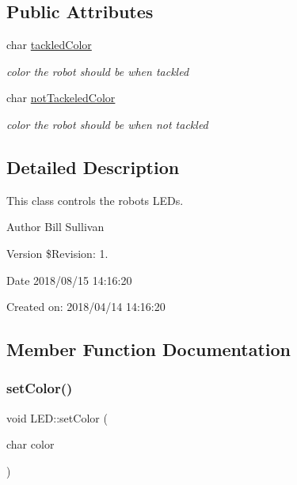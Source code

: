 \subsection*{Public Attributes}
\begin{DoxyCompactItemize}
\item 
\mbox{\label{class_l_e_d_abdf064808bc54c7ca18456de4f0df0a0}} 
char \mbox{\hyperlink{class_l_e_d_abdf064808bc54c7ca18456de4f0df0a0}{tackled\+Color}}
\begin{DoxyCompactList}\small\item\em color the robot should be when tackled \end{DoxyCompactList}\item 
\mbox{\label{class_l_e_d_acea9ddf3407c6535463a509d04ddfeda}} 
char \mbox{\hyperlink{class_l_e_d_acea9ddf3407c6535463a509d04ddfeda}{not\+Tackeled\+Color}}
\begin{DoxyCompactList}\small\item\em color the robot should be when not tackled \end{DoxyCompactList}\end{DoxyCompactItemize}


\subsection{Detailed Description}
This class controls the robots L\+E\+Ds. 

\begin{DoxyAuthor}{Author}
Bill Sullivan
\end{DoxyAuthor}
\begin{DoxyVersion}{Version}
\$\+Revision\+: 1.
\end{DoxyVersion}
\begin{DoxyDate}{Date}
2018/08/15 14\+:16\+:20
\end{DoxyDate}
Created on\+: 2018/04/14 14\+:16\+:20 

\subsection{Member Function Documentation}
\mbox{\label{class_l_e_d_ad122ee4ef58452558498c249fc293870}} 
\subsubsection{\texorpdfstring{set\+Color()}{setColor()}}
{\footnotesize\ttfamily void L\+E\+D\+::set\+Color (\begin{DoxyParamCaption}\item[{char}]{color }\end{DoxyParamCaption})}



